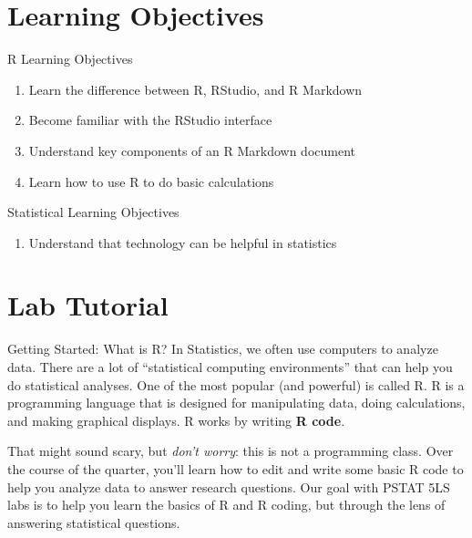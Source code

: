 \documentclass[
  ignorenonframetext,
]{beamer}
\providecommand{\tightlist}{%
  \setlength{\itemsep}{0pt}\setlength{\parskip}{0pt}}
\begin{document}
\section{Learning Objectives}\label{learning-objectives}

\begin{frame}{R Learning Objectives}
\label{r-learning-objectives}
\begin{enumerate}
\tightlist
\item
  Learn the difference between R, RStudio, and R Markdown
\item
  Become familiar with the RStudio interface
\item
  Understand key components of an R Markdown document
\item
  Learn how to use R to do basic calculations
\end{enumerate}
\end{frame}

\begin{frame}{Statistical Learning Objectives}
\label{statistical-learning-objectives}
\begin{enumerate}
\tightlist
\item
  Understand that technology can be helpful in statistics
\end{enumerate}
\end{frame}

\section{Lab Tutorial}\label{lab-tutorial}

\begin{frame}{Getting Started: What is R?}
\label{getting-started-what-is-r}
In Statistics, we often use computers to analyze data. There are a lot
of ``statistical computing environments'' that can help you do
statistical analyses. One of the most popular (and powerful) is called
R. R is a programming language that is designed for manipulating data,
doing calculations, and making graphical displays. R works by writing
\textbf{R code}.

That might sound scary, but \emph{don't worry}: this is not a
programming class. Over the course of the quarter, you'll learn how to
edit and write some basic R code to help you analyze data to answer
research questions. Our goal with PSTAT 5LS labs is to help you learn
the basics of R and R coding, but through the lens of answering
statistical questions.
\end{frame}
\end{document}
